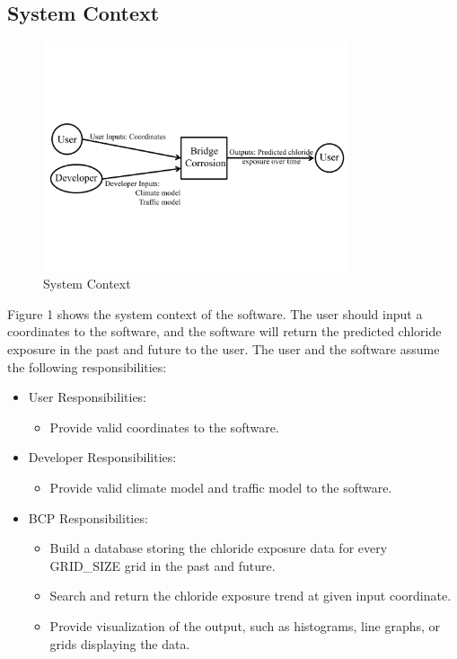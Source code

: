 \documentclass[12pt]{article}
\begin{document}
\subsection{System Context}
\begin{figure}[h!]
\begin{center}
 \includegraphics[width=0.8\textwidth]{SystemContextFigure}
\caption{System Context}
\label{Fig_SystemContext} 
\end{center}
\end{figure}


Figure 1 shows the system context of the software. The user should input a coordinates to the software, and the software will return the predicted chloride exposure in the past and future to the user. The user and the software assume the following responsibilities:

\begin{itemize}
\item User Responsibilities:
\begin{itemize}
\item Provide valid coordinates to the software.
\end{itemize}

\item Developer Responsibilities:
\begin{itemize}
\item Provide valid climate model and traffic model to the software.
\end{itemize}

\item BCP Responsibilities:
\begin{itemize}
\item Build a database storing the chloride exposure data for every GRID\_SIZE grid in the past and future.
\item Search and return the chloride exposure trend at given input coordinate.
\item Provide visualization of the output, such as histograms, line graphs, or grids displaying the data.
\end{itemize}
\end{itemize}
\end{document}
